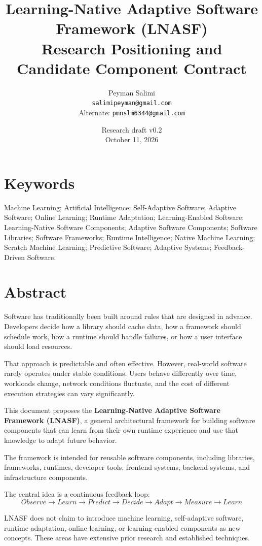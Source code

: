 \documentclass[11pt,a4paper]{article}
\title{Learning-Native Adaptive Software Framework (LNASF)\\\large Research Positioning and Candidate Component Contract}
\author{Peyman Salimi\\\texttt{salimipeyman@gmail.com}\\\small Alternate: \texttt{pmnslm6344@gmail.com}}
\date{Research draft v0.2\\October 11, 2026}
\begin{document}
\maketitle
\newpage
\tableofcontents
\newpage

\section*{Keywords}
Machine Learning; Artificial Intelligence; Self-Adaptive Software; Adaptive Software; Online Learning; Runtime Adaptation; Learning-Enabled Software; Learning-Native Software Components; Adaptive Software Components; Software Libraries; Software Frameworks; Runtime Intelligence; Native Machine Learning; Scratch Machine Learning; Predictive Software; Adaptive Systems; Feedback-Driven Software.

\section*{Abstract}
Software has traditionally been built around rules that are designed in advance. Developers decide how a library should cache data, how a framework should schedule work, how a runtime should handle failures, or how a user interface should load resources.

That approach is predictable and often effective. However, real-world software rarely operates under stable conditions. Users behave differently over time, workloads change, network conditions fluctuate, and the cost of different execution strategies can vary significantly.

This document proposes the \textbf{Learning-Native Adaptive Software Framework (LNASF)}, a general architectural framework for building software components that can learn from their own runtime experience and use that knowledge to adapt future behavior.

The framework is intended for reusable software components, including libraries, frameworks, runtimes, developer tools, frontend systems, backend systems, and infrastructure components.

The central idea is a continuous feedback loop:
\[
Observe \rightarrow Learn \rightarrow Predict \rightarrow Decide \rightarrow Adapt \rightarrow Measure \rightarrow Learn
\]

LNASF does not claim to introduce machine learning, self-adaptive software, runtime adaptation, online learning, or learning-enabled components as new concepts. These areas have extensive prior research and established techniques.
\end{document}
